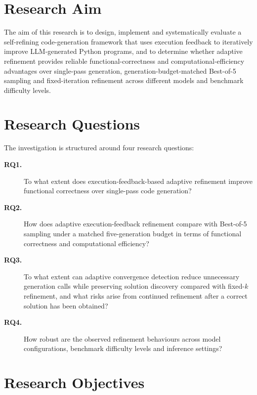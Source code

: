 \section{Research Aim}

The aim of this research is to design, implement and systematically evaluate a self-refining code-generation framework that uses execution feedback to iteratively improve LLM-generated Python programs, and to determine whether adaptive refinement provides reliable functional-correctness and computational-efficiency advantages over single-pass generation, generation-budget-matched Best-of-5 sampling and fixed-iteration refinement across different models and benchmark difficulty levels.

\section{Research Questions}

The investigation is structured around four research questions:

\begin{description}

\item[\textbf{RQ1.}] To what extent does execution-feedback-based adaptive refinement improve functional correctness over single-pass code generation?

\item[\textbf{RQ2.}] How does adaptive execution-feedback refinement compare with Best-of-5 sampling under a matched five-generation budget in terms of functional correctness and computational efficiency?

\item[\textbf{RQ3.}] To what extent can adaptive convergence detection reduce unnecessary generation calls while preserving solution discovery compared with fixed-$k$ refinement, and what risks arise from continued refinement after a correct solution has been obtained?

\item[\textbf{RQ4.}] How robust are the observed refinement behaviours across model configurations, benchmark difficulty levels and inference settings?

\end{description}

\section{Research Objectives}


